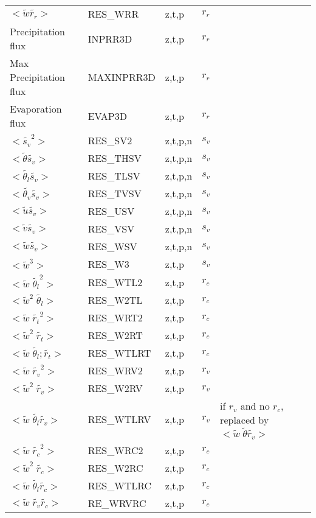 \begin{center}
\begin{makeimage}
\begin{tabular}{||p{6cm}|>{\centering}p{2.5cm}|>{\centering}p{1.5cm}|>{\centering}p{0.5cm}|p{5cm }||}
\cline{1-4}
$<\tilde{w}\tilde{r_r}>$ & RES\_WRR &z,t,p &   $r_r$ &\\
\cline{1-4}
Precipitation flux  & INPRR3D  &z,t,p &   $r_r$ &\\
\cline{1-4}
Max Precipitation flux  & MAXINPRR3D  &z,t,p &   $r_r$ &\\
\cline{1-4}
Evaporation flux  & EVAP3D  &z,t,p &   $r_r$ &\\
\cline{1-4}
$<\tilde{s_v}^2>$ & RES\_SV2 &z,t,p,n &   $s_v$ &\\
\cline{1-4}
$<\tilde{\theta}\tilde{s_v}>$ & RES\_THSV &z,t,p,n &   $s_v$ &\\
\cline{1-4}
$<\tilde{\theta_l}\tilde{s_v}>$ & RES\_TLSV &z,t,p,n &  $s_v$ &\\
\cline{1-4}
$<\tilde{\theta_v}\tilde{s_v}>$ & RES\_TVSV &z,t,p,n &  $s_v$ &\\
\cline{1-4}
$<\tilde{u}\tilde{s_v}>$ & RES\_USV &z,t,p,n  & $s_v$  &\\
\cline{1-4}
$<\tilde{v}\tilde{s_v}>$ & RES\_VSV &z,t,p,n  &  $s_v$ &\\
\cline{1-4}
$<\tilde{w}\tilde{s_v}>$ & RES\_WSV &z,t,p,n  &  $s_v$ &\\
\cline{1-4}
$<\tilde{w}^3>$ & RES\_W3 &z,t,p   &  $s_v$ &\\
\cline{1-4}
$<\tilde{w}\;\tilde{\theta_l}^2>$ & RES\_WTL2 &z,t,p &  $r_c$ &\\
\cline{1-4}
$<\tilde{w}^2\;\tilde{\theta_l}>$ & RES\_W2TL &z,t,p &  $r_c$ &\\
\cline{1-4}
$<\tilde{w}\;\tilde{r_t}^2>$ & RES\_WRT2 &z,t,p &  $r_c$ &\\
\cline{1-4}
$<\tilde{w}^2\;\tilde{r_t}>$ & RES\_W2RT &z,t,p &  $r_c$ &\\
\cline{1-4}
$<\tilde{w}\;\tilde{\theta_l};\tilde{r_t}>$ & RES\_WTLRT &z,t,p &  $r_c$ &\\
\cline{1-4}
$<\tilde{w}\;\tilde{r_v}^2>$ & RES\_WRV2 &z,t,p &  $r_v$ &\\
\cline{1-4}
$<\tilde{w}^2\;\tilde{r_v}>$ & RES\_W2RV &z,t,p &  $r_v$ &\\
\hline
$<\tilde{w}\;\tilde{\theta_l}\tilde{r_v}>$ & RES\_WTLRV &z,t,p &  $r_v$ &{if $r_v$ and no $r_c$, replaced by $<\tilde{w}\;\tilde{\theta}\tilde{r_v}>$}\\
\hline
$<\tilde{w}\;\tilde{r_c}^2>$ & RES\_WRC2 &z,t,p &  $r_c$ &\\
\cline{1-4}
$<\tilde{w}^2\;\tilde{r_c}>$ & RES\_W2RC &z,t,p &  $r_c$ &\\
\cline{1-4}
$<\tilde{w}\;\tilde{\theta_l}\tilde{r_c}>$ & RES\_WTLRC &z,t,p &  $r_c$ & \\
\cline{1-4}
$<\tilde{w}\;\tilde{r_v}\tilde{r_c}>$ & RE\_WRVRC &z,t,p &  $r_c$ &\\
\hline
\hline
\end{tabular}
\end{makeimage}
\end{center}

